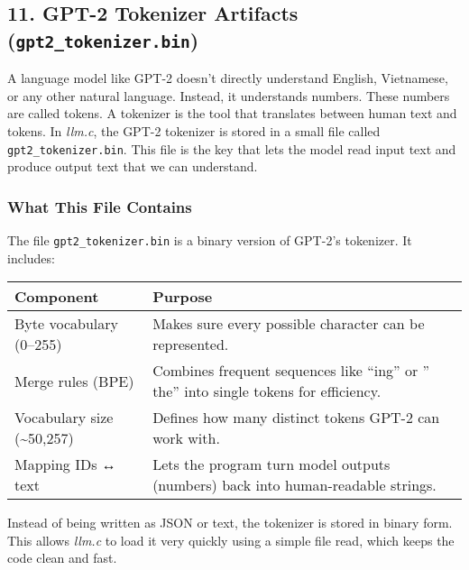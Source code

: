 \documentclass[
  letterpaper,
  DIV=11,
  numbers=noendperiod]{scrreprt}
\begin{document}
\subsection{\texorpdfstring{11. GPT-2 Tokenizer Artifacts
(\texttt{gpt2\_tokenizer.bin})}{11. GPT-2 Tokenizer Artifacts (gpt2\_tokenizer.bin)}}\label{gpt-2-tokenizer-artifacts-gpt2_tokenizer.bin}

A language model like GPT-2 doesn't directly understand English,
Vietnamese, or any other natural language. Instead, it understands
numbers. These numbers are called tokens. A tokenizer is the tool that
translates between human text and tokens. In \emph{llm.c}, the GPT-2
tokenizer is stored in a small file called \texttt{gpt2\_tokenizer.bin}.
This file is the key that lets the model read input text and produce
output text that we can understand.

\subsubsection{What This File Contains}\label{what-this-file-contains}

The file \texttt{gpt2\_tokenizer.bin} is a binary version of GPT-2's
tokenizer. It includes:

\begin{longtable}[]{@{}
  >{\raggedright\arraybackslash}p{}
  >{\raggedright\arraybackslash}p{}@{}}
\toprule\noalign{}
\begin{minipage}[b]{\linewidth}\raggedright
Component
\end{minipage} & \begin{minipage}[b]{\linewidth}\raggedright
Purpose
\end{minipage} \\
\midrule\noalign{}
\endhead
\bottomrule\noalign{}
\endlastfoot
Byte vocabulary (0--255) & Makes sure every possible character can be
represented. \\
Merge rules (BPE) & Combines frequent sequences like ``ing'' or '' the''
into single tokens for efficiency. \\
Vocabulary size (\textasciitilde50,257) & Defines how many distinct
tokens GPT-2 can work with. \\
Mapping IDs ↔ text & Lets the program turn model outputs (numbers) back
into human-readable strings. \\
\end{longtable}

Instead of being written as JSON or text, the tokenizer is stored in
binary form. This allows \emph{llm.c} to load it very quickly using a
simple file read, which keeps the code clean and fast.
\end{document}
